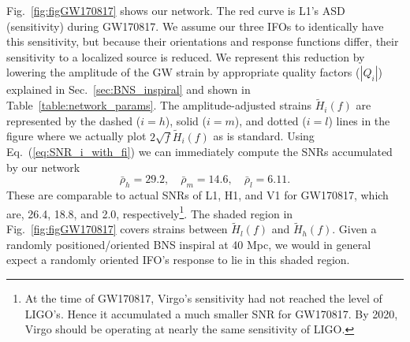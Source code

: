\documentclass[prd,amsmath,amssymb,aps,floats,amsfonts,notitlepage,superscriptaddress,eqsecnum,nofootinbib,10pt]{revtex4-1}
\newcommand{\be}{\begin{equation}}
\newcommand{\ee}{\end{equation}}
\begin{document}
Fig.~\ref{fig:figGW170817} shows our network. The red curve is L1's ASD (sensitivity) during GW170817. We assume our three IFOs to identically have this sensitivity,
but because their orientations and response functions differ, their sensitivity to a localized source is reduced. We represent this reduction by lowering the
amplitude of the GW strain by appropriate quality factors ($|Q_i|$) explained in Sec.~\ref{sec:BNS_inspiral} and shown in Table~\ref{table:network_params}.
The amplitude-adjusted strains $ \tilde{H}_i(f)$ are represented by the dashed ($i=h$), solid ($i=m$), and dotted ($i=l$) lines in the figure where we actually plot
$2\sqrt{f} \tilde{H}_i(f)$ as is standard. 
Using Eq.~(\ref{eq:SNR_i_with_fi}) we can immediately compute the SNRs accumulated by our network
%
\be
\bar\rho_h = 29.2,\quad \bar\rho_m = 14.6,\quad \bar\rho_l = 6.11 \label{eq:GW170817_SNRs}.
\ee
%
These are comparable to actual SNRs of L1, H1, and V1 for GW170817, which are, 26.4, 18.8, and 2.0, respectively\footnote{At the time of GW170817, Virgo's sensitivity had not reached the level of LIGO's. Hence it accumulated a much smaller SNR for GW170817. By 2020, Virgo should be operating at nearly the same sensitivity of LIGO.}.
The shaded region in Fig.~\ref{fig:figGW170817} covers strains between $\tilde{H}_l(f)$ and $\tilde{H}_h(f)$. %
Given a randomly positioned/oriented BNS inspiral at 40 Mpc, we would in general expect a randomly oriented IFO's response to lie in this shaded region.
%
%
\end{document}
